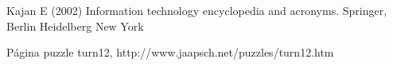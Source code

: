 %
%

%
% 
% 
%
\begin{thebibliography}{99.}
%
%
%
 Kajan E (2002)
Information technology encyclopedia and acronyms. Springer, Berlin
Heidelberg New York

 Página puzzle turn12, http://www.jaapsch.net/puzzles/turn12.htm

\end{thebibliography}
